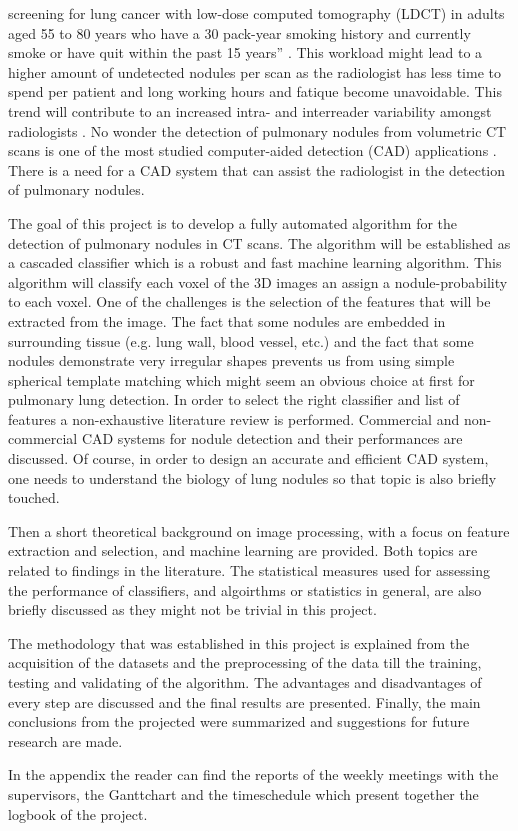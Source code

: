 screening for lung cancer with low-dose computed tomography (LDCT) in adults
aged 55 to 80 years who have a 30 pack-year smoking history and currently smoke
or have quit within the past 15 years'' \cite{ups}. This workload might lead to
a higher amount of undetected nodules per scan as the radiologist has
less time to spend per patient and long working hours and fatique become
unavoidable. This trend will contribute to an increased intra- and
interreader variability amongst radiologists \cite{armato, hens}. No wonder the
detection of pulmonary nodules from volumetric CT scans is one of the most studied computer-aided detection (CAD) applications
\cite{sluimer}. There is a need for a CAD system that can assist the radiologist
in the detection of pulmonary nodules.

The goal of this project is to develop a fully automated algorithm for the
detection of pulmonary nodules in CT scans. The algorithm will be established as
a cascaded classifier which is a robust and fast machine learning algorithm.
This algorithm will classify each voxel of the 3D images an assign a
nodule-probability to each voxel. One of the challenges is the selection of the
features that will be extracted from the image. The fact that some nodules are
embedded in surrounding tissue (e.g.
lung wall, blood vessel, etc.) and the fact that some nodules demonstrate very
irregular shapes prevents us from using simple spherical template matching which
might seem an obvious choice at first for pulmonary lung detection. In order to
select the right classifier and list of features a non-exhaustive literature
review is performed. Commercial and non-commercial CAD systems for nodule
detection and their performances are discussed. Of course, in order to design an
accurate and efficient CAD system, one needs to understand the biology of lung
nodules so that topic is also briefly touched.

Then a short theoretical background on image processing, with a focus on feature
extraction and selection, and machine learning are provided. Both topics
are related to findings in the literature. The statistical measures used for
assessing the performance of classifiers, and algoirthms or statistics in
general, are also briefly discussed as they might not be trivial in this
project.

The methodology that was established in this project is explained from the
acquisition of the datasets and the preprocessing of the data till the training,
testing and validating of the algorithm. The advantages and disadvantages of
every step are discussed and the final results are presented. Finally, the main
conclusions from the projected were summarized and suggestions for future
research are made.

In the appendix the reader can find the reports of the weekly meetings with the
supervisors, the Ganttchart and the timeschedule which present together the
logbook of the project.








